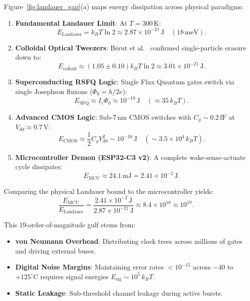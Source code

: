 \documentclass[10pt,twocolumn,a4paper]{article}
\begin{document}
Figure~\ref{fig:landauer_gap}(a) maps energy dissipation across physical paradigms:
\begin{enumerate}
    \item \textbf{Fundamental Landauer Limit}: At $T = 300\,\mathrm{K}$:
    \begin{equation}
    E_{\mathrm{Landauer}} = k_B T \ln 2 \approx 2.87 \times 10^{-21}\,\mathrm{J} \quad (18\,\mathrm{meV}).
    \end{equation}
    \item \textbf{Colloidal Optical Tweezers}: Bérut et al.~\cite{berut2012experimental} confirmed single-particle erasure down to:
    \begin{equation}
    E_{\mathrm{colloid}} \approx (1.05 \pm 0.10) k_B T \ln 2 \approx 3.01 \times 10^{-21}\,\mathrm{J}.
    \end{equation}
    \item \textbf{Superconducting RSFQ Logic}: Single Flux Quantum gates switch via single Josephson fluxons ($\Phi_0 = h/2e$):
    \begin{equation}
    E_{\mathrm{SFQ}} \approx I_c \Phi_0 \approx 10^{-19}\,\mathrm{J} \quad (\approx 35\,k_BT).
    \end{equation}
    \item \textbf{Advanced CMOS Logic}: Sub-7\,nm CMOS switches with $C_g \sim 0.2\,\mathrm{fF}$ at $V_{dd} \approx 0.7\,\mathrm{V}$:
    \begin{equation}
    E_{\mathrm{CMOS}} \approx \frac{1}{2} C_g V_{dd}^2 \sim 10^{-16}\,\mathrm{J} \quad (\sim 3.5 \times 10^4\,k_BT).
    \end{equation}
    \item \textbf{Microcontroller Demon (ESP32-C3 v2)}: A complete wake-sense-actuate cycle dissipates:
    \begin{equation}
    E_{\mathrm{MCU}} \approx 24.1\,\mathrm{mJ} = 2.41 \times 10^{-2}\,\mathrm{J}.
    \end{equation}
\end{enumerate}

Comparing the physical Landauer bound to the microcontroller yields:
\begin{equation}
\frac{E_{\mathrm{MCU}}}{E_{\mathrm{Landauer}}} = \frac{2.41 \times 10^{-2}\,\mathrm{J}}{2.87 \times 10^{-21}\,\mathrm{J}} \approx 8.4 \times 10^{18} \approx 10^{19}.
\end{equation}

This 19-order-of-magnitude gulf stems from:
\begin{itemize}
    \item \textbf{von Neumann Overhead}: Distributing clock trees across millions of gates and driving external buses.
    \item \textbf{Digital Noise Margins}: Maintaining error rates $< 10^{-15}$ across $-40$ to $+125^\circ\mathrm{C}$ requires signal energies $E_{\mathrm{sig}} \sim 10^5\,k_BT$.
    \item \textbf{Static Leakage}: Sub-threshold channel leakage during active bursts.
\end{itemize}
\end{document}
